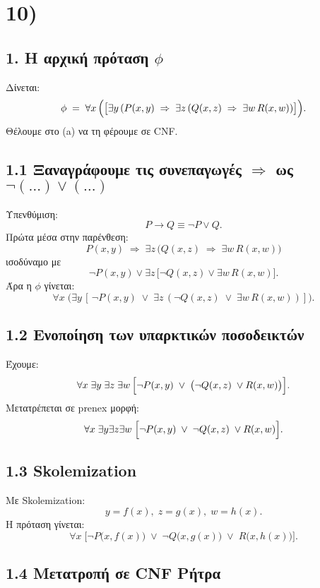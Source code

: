 \documentclass[a4paper,12pt]{article}
\begin{document}
\section*{10)}

\subsection*{1. Η αρχική πρόταση $\phi$}

Δίνεται:
\[
\phi \;=\; \forall x\,\Bigl(\bigl[\exists y\,(P(x,y)\;\Rightarrow\;\exists z\,(Q(x,z)\;\Rightarrow\;\exists w\,R(x,w))\bigr]\Bigr).
\]
Θέλουμε στο (a) να τη φέρουμε σε CNF.

\subsection*{1.1 Ξαναγράφουμε τις συνεπαγωγές $\Rightarrow$ ως $\neg(\dots)\lor(\dots)$}

Υπενθύμιση:
\[
P \to Q \equiv \neg P \lor Q.
\]
Πρώτα μέσα στην παρένθεση:
\[
P(x,y) \;\Rightarrow\; \exists z\,\bigl(Q(x,z) \;\Rightarrow\; \exists w\,R(x,w)\bigr)
\]
ισοδύναμο με
\[
\neg P(x,y) \lor \exists z\,\bigl[\neg Q(x,z) \lor \exists w\,R(x,w)\bigr].
\]
Άρα η $\phi$ γίνεται:
\[
\forall x\;\bigl(\exists y\,[\,\neg P(x,y)\;\lor\;\exists z\,(\neg Q(x,z)\;\lor\;\exists w\,R(x,w))]\bigr).
\]

\subsection*{1.2 Ενοποίηση των υπαρκτικών ποσοδεικτών}

Έχουμε:
\[
\forall x\;\exists y\;\exists z\;\exists w\,\Bigl[\neg P(x,y)\;\lor\;\bigl(\neg Q(x,z)\;\lor R(x,w)\bigr)\Bigr].
\]
Μετατρέπεται σε prenex μορφή:
\[
\forall x\;\exists y\exists z\exists w\;\Bigl[\neg P(x,y)\;\lor\;\neg Q(x,z)\;\lor R(x,w)\Bigr].
\]

\subsection*{1.3 Skolemization}

Με Skolemization:
\[
y = f(x), \; z = g(x), \; w = h(x).
\]
Η πρόταση γίνεται:
\[
\forall x\;\bigl[\neg P\bigl(x,f(x)\bigr)\;\lor\;\neg Q\bigl(x,g(x)\bigr)\;\lor\; R\bigl(x,h(x)\bigr)\bigr].
\]

\subsection*{1.4 Μετατροπή σε CNF Ρήτρα}
\end{document}
